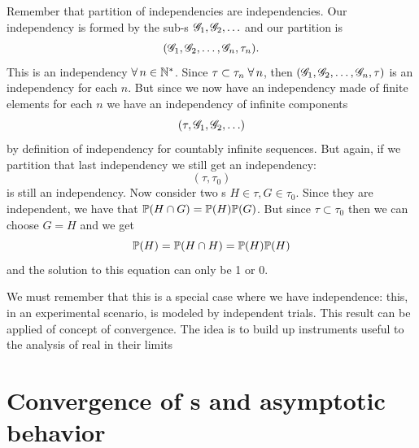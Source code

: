 \documentclass{report}
\begin{document}
\begin{fancyproof}
	Remember that partition of independencies are independencies. Our independency is formed by the sub-\sa s $\mathscr{G}_1,\mathscr{G}_2,\ldots$ and our partition is
	\[(\mathscr{G}_1,\mathscr{G}_2,\ldots,\mathscr{G}_n,\tau_n).\]
	This is an independency $\forall\, n\in\mathbb{N}^{*}$. Since $\tau\subset\tau_n\;\forall\, n$, then $(\mathscr{G}_1,\mathscr{G}_2,\ldots,\mathscr{G}_n,\tau)$ is an independency for each $n$. But since we now have an independency made of finite elements for each $n$ we have an independency of infinite components
	\[(\tau,\mathscr{G}_1,\mathscr{G}_2,\ldots)\]
	by definition of independency for countably infinite sequences. But again, if we partition that last independency we still get an independency:
	\[(\tau,\tau_0)\]
	is still an independency. Now consider two \sa s $H\in\tau,G\in\tau_0$. Since they are independent, we have that $\mathbb{P}(H\cap G)=\mathbb{P}(H)\mathbb{P}(G)$. But since $\tau\subset\tau_0$ then we can choose $G=H$ and we get
	\[\mathbb{P}(H)=\mathbb{P}(H\cap H)=\mathbb{P}(H)\mathbb{P}(H)\]
	and the solution to this equation can only be 1 or 0.
\end{fancyproof}
We must remember that this is a special case where we have independence: this, in an experimental scenario, is modeled by independent trials. This result can be applied of concept of convergence. The idea is to build up instruments useful to the analysis of real \rv{} in their limits
\section{Convergence of \rv s and asymptotic behavior}
\end{document}
